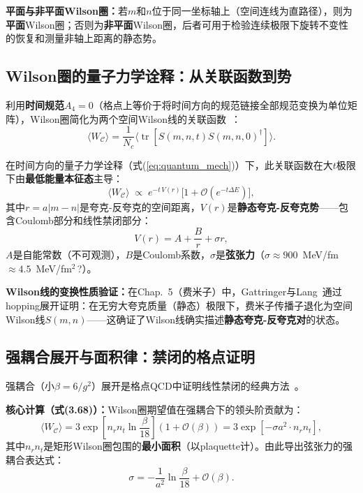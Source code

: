 \documentclass[12pt,a4paper]{ctexart}
\theoremstyle{definition}
\begin{document}
\textbf{平面与非平面Wilson圈：}若$m$和$n$位于同一坐标轴上（空间连线为直路径），则为\textbf{平面}Wilson圈；否则为\textbf{非平面}Wilson圈，后者可用于检验连续极限下旋转不变性的恢复和测量非轴上距离的静态势。

\subsection{Wilson圈的量子力学诠释：从关联函数到势}

利用\textbf{时间规范}$A_4=0$（格点上等价于将时间方向的规范链接全部规范变换为单位矩阵），Wilson圈简化为两个空间Wilson线的关联函数~\cite{GattringerLang2010}：
\begin{equation}
\langle W_{\mathcal{C}} \rangle = \frac{1}{N_c} \langle \operatorname{tr}[S(m,n,t) S(m,n,0)^\dagger] \rangle.
\label{eq:WL_correlator}
\end{equation}

在时间方向的量子力学诠释（式(\ref{eq:quantum_mech})）下，此关联函数在大$t$极限下由\textbf{最低能量本征态}主导：
\begin{equation}
\langle W_{\mathcal{C}} \rangle \;\propto\; e^{-t\,V(r)} \Big[1 + \mathcal{O}(e^{-t\Delta E})\Big],
\label{eq:WL_potential}
\end{equation}
其中$r = a|m-n|$是夸克-反夸克的空间距离，$V(r)$是\textbf{静态夸克-反夸克势}——包含Coulomb部分和线性禁闭部分：
\begin{equation}
\boxed{V(r) = A + \frac{B}{r} + \sigma r},
\label{eq:static_potential}
\end{equation}
$A$是自能常数（不可观测），$B$是Coulomb系数，$\sigma$是\textbf{弦张力}（$\sigma \approx 900$~MeV/fm $\approx 4.5$~MeV/fm$^2\,$?）。

\textbf{Wilson线的变换性质验证：}在Chap.~5（费米子）中，Gattringer与Lang~\cite{GattringerLang2010}通过hopping展开证明：在无穷大夸克质量（静态）极限下，费米子传播子退化为空间Wilson线$S(m,n)$——这确证了Wilson线确实描述\textbf{静态夸克-反夸克对}的状态。

\subsection{强耦合展开与面积律：禁闭的格点证明}

强耦合（小$\beta = 6/g^2$）展开是格点QCD中证明线性禁闭的经典方法~\cite{GattringerLang2010,Wilson1974}。

\textbf{核心计算（式(3.68)）：}Wilson圈期望值在强耦合下的领头阶贡献为：
\begin{equation}
\langle W_{\mathcal{C}} \rangle = 3 \exp\!\left[ n_r n_t \ln\frac{\beta}{18} \right] (1+\mathcal{O}(\beta)) = 3 \exp\!\left[ -\sigma a^2 \cdot n_r n_t \right],
\label{eq:strong_coupling_WL}
\end{equation}
其中$n_r n_t$是矩形Wilson圈包围的\textbf{最小面积}（以plaquette计）。由此导出弦张力的强耦合表达式：
\begin{equation}
\sigma = -\frac{1}{a^2}\ln\frac{\beta}{18} + \mathcal{O}(\beta).
\label{eq:string_tension_SC}
\end{equation}
\end{document}
